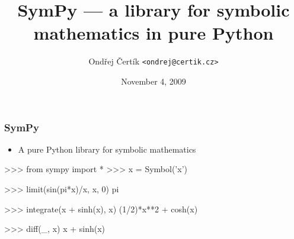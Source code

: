 \documentclass[handout]{beamer}
\title{SymPy --- a library for symbolic mathematics \linebreak in pure Python}
\author{Ondřej Čertík \texttt{<ondrej@certik.cz>}}
\institute[PWR]{University of Nevada, Reno\linebreak SymPy Development Team}
\date{November 4, 2009}
\begin{document}

\frame{\titlepage}

\begin{frame}[fragile]
    \frametitle{SymPy}

    \begin{itemize}
        \item A pure Python library for symbolic mathematics
    \end{itemize}

    \begin{python}
  >>> from sympy import *
  >>> x = Symbol('x')

  >>> limit(sin(pi*x)/x, x, 0)
  pi

  >>> integrate(x + sinh(x), x)
  (1/2)*x**2 + cosh(x)

  >>> diff(_, x)
  x + sinh(x)
    \end{python}
\end{frame}
\end{document}
